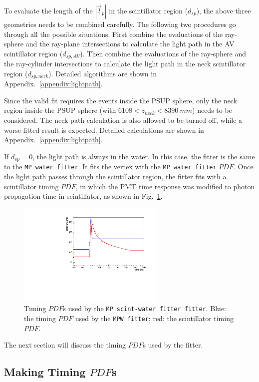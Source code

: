 To evaluate the length of the $|\vec{l}_p|$ in the scintillator region ($d_{sp}$), the above three geometries needs to be combined carefully. The following two procedures go through all the possible situations. First combine the evaluations of the ray-sphere and the ray-plane intersections to calculate the light path in the AV scintillator region ($d_{sp,AV}$). Then combine the evaluations of the ray-sphere and the ray-cylinder intersections to calculate the light path in the neck scintillator region ($d_{sp,neck}$). Detailed algorithms are shown in Appendix.~\ref{appendix:lightpath}.

Since the valid fit requires the events inside the PSUP sphere, only the neck region inside the PSUP sphere (with $6108<z_{neck}<8390~mm$) needs to be considered. The neck path calculation is also allowed to be turned off, while a worse fitted result is expected. Detailed calculations are shown in Appendix.~\ref{appendix:lightpath}.

If $d_{sp}=0$, the light path is always in the water. In this case, the fitter is the same to the \texttt{MP water fitter}. It fits the vertex with the \texttt{MP water fitter} $PDF$. Once the light path passes through the scintillator region, the fitter fits with a scintillator timing $PDF$, in which the PMT time response was modified to photon propagation time in scintillator, as shown in Fig.~\ref{partialpdf}.

\begin{figure}[htbp]
	\centering	
	\includegraphics[width=7cm]{scintpdf.pdf}
	\caption[Timing $PDF$s used by the \texttt{MP scint-water fitter fitter}.]{Timing $PDF$s used by the \texttt{MP scint-water fitter fitter}. Blue: the timing $PDF$ used by the \texttt{MPW fitter}; red: the scintillator timing $PDF$.}
	\label{partialpdf}
\end{figure}

The next section will discuss the timing $PDF$s used by the fitter.

\subsection{Making Timing $PDF$s}

